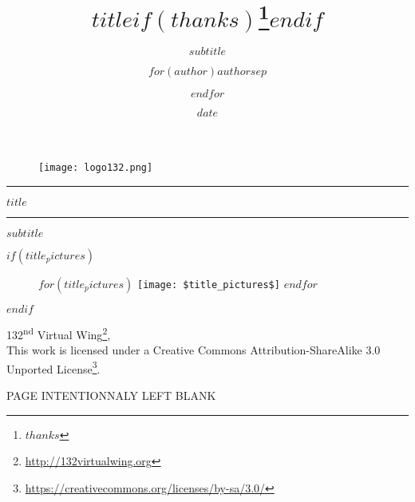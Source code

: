 \documentclass[$if(fontsize)$$fontsize$,$endif$$if(lang)$$babel-lang$,$endif$$if(papersize)$$papersize$paper,$endif$$for(classoption)$$classoption$$sep$,$endfor$]{$documentclass$}
\title{$title$$if(thanks)$\thanks{$thanks$}$endif$}
\subtitle{$subtitle$}
\author{$for(author)$$author$$sep$ \and $endfor$}
\institute{$for(institute)$$institute$$sep$ \and $endfor$}
\date{$date$}
\renewcommand{\href}[2]{#2\footnote{\url{#1}}}
\newcommand{\wing}{132\textsuperscript{nd} Virtual Wing}
\begin{document}
\thispagestyle{empty}

\begin{center}
    \vspace*{\fill}

    \begin{figure}[h]
      \centering
      \texttt{[image: logo132.png]}
    \end{figure}

    \vspace{2cm}

    \noindent\rule{\textwidth}{0.4pt}

    {\fontsize{2cm}{2.3cm}\selectfont $title$\par}

    \noindent\rule{\textwidth}{0.4pt}


    $subtitle$

    $if(title_pictures)$
        \begin{figure}[h]
            \begin{minipage}[c]{\linewidth}
                \centering
                $for(title_pictures)$
                      \texttt{[image: \$title\_pictures\$]}
                $endfor$
            \end{minipage}
        \end{figure}
    $endif$

    \vfill

    {\href{http://132virtualwing.org}{\wing}}, \the\year \\
    \vspace{0.3cm}
    This work is licensed under a {\href{https://creativecommons.org/licenses/by-sa/3.0/}{Creative Commons Attribution-ShareAlike 3.0 Unported License}}.

\end{center}


\newpage
    \clearpage
    \thispagestyle{empty}
    \null
    \vfill
    \begin{center}
    \begin{minipage}{.6\textwidth}
    \centering PAGE INTENTIONNALY LEFT BLANK
    \end{minipage}
    \end{center}
    \vfill %
\clearpage
\newpage
\end{document}
